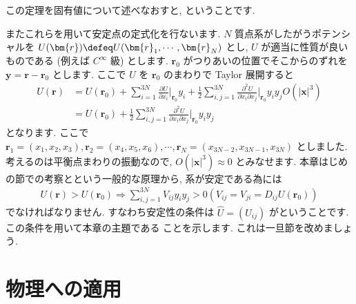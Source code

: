 \documentclass[openany, a4paper, oneside]{jsbook}
\begin{document}
\begin{rem}
この定理を固有値について述べなおすと,
ということです.
\label{rem:3.1}
\end{rem}

またこれらを用いて安定点の定式化を行ないます.
$N$ 質点系がしたがうポテンシャルを $U (\bm{r}) \defeq U ( \bm{r}_1,\dotsb,\bm{r}_N)$ とし,
$U$ が適当に性質が良いものである (例えば $C^{\infty}$ 級) とします.
$\bm{r}_0$ がつりあいの位置でそこからのずれを $\bm{y} = \bm{r} - \bm{r}_0$ とします.
ここで $U$ を $\bm{r}_0$ のまわりで Taylor 展開すると
\begin{align}
U ( \bm{r} )
&=
U ( \bm{r}_0 ) + \sum_{i=1}^{3N} \frac{\partial U} {\partial x_i} \bigg|_{\bm{r}_0} y_i
+\frac{1} {2} \sum_{i,j=1}^{3N} \frac{\partial^2 U} {\partial x_i \partial x_j}\bigg|_{\bm{r}_0} y_i y_j
O ( |\bm{x}|^3)\\
&=
U ( \bm{r}_0 ) + \frac{1} {2} \sum_{i,j=1}^{3N} \frac{\partial^2 U} {\partial x_i \partial x_j}\bigg|_{\bm{r}_0} y_i y_j
\end{align}
となります.
ここで $\bm{r}_1=(x_1,x_2,x_3),\bm{r}_2=(x_4,x_5,x_6),\dotsb,\bm{r}_N=(x_{3N-2},x_{3N-1},x_{3N})$ としました.
考えるのは平衡点まわりの振動なので,  $O ( |\bm{x}|^3) \approx 0$ とみなせます.
本章はじめの節での考察とという一般的な原理から,
系が安定である為には
\begin{align}
U ( \bm{r} )
>
U ( \bm{r}_0 )
\Longrightarrow \sum_{i,j=1}^{3N} V_{ij} y_i y_j > 0
\left ( V_{ij} = V_{j i} = D_{ij} U ( {\bm{r}_0}) \right)
\end{align}
でなければなりません.
すなわち安定性の条件は
 $\hat{U} = ( U_{ij})$ がということです.
この条件を用いて本章の主題である
ことを示します.
これは一旦節を改めましょう.
\section{物理への適用}
\end{document}
